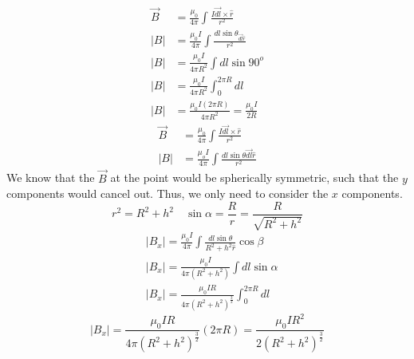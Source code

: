 \documentclass{article}
\begin{document}
$$
\begin{aligned}
\vec{B} & =\frac{\mu_0}{4 \pi} \int \frac{I \overrightarrow{d l} \times \hat{r}}{r^2} \\
|B| & =\frac{\mu_0 I}{4 \pi} \int \frac{d l \sin \theta_{\overrightarrow{d l} \hat{r}}}{r^2} \\
|B| & =\frac{\mu_0 I}{4 \pi R^2} \int d l \sin 90^o \\
|B| & =\frac{\mu_0 I}{4 \pi R^2} \int_0^{2\pi R} d l \\
|B| & =\frac{\mu_0 I(2 \pi R)}{4 \pi R^2}=\frac{\mu_0 I}{2 R}
\end{aligned}
$$
\sol
{}
$$
\begin{aligned}
\vec{B} & =\frac{\mu_0}{4 \pi} \int \frac{I \overrightarrow{d l} \times \hat{r}}{r^2} \\
|B| & =\frac{\mu_o I}{4 \pi} \int \frac{d l \sin \theta \overrightarrow{d l} \hat{r}}{r^2}
\end{aligned}
$$
We know that the $\vec{B}$ at the point would be spherically symmetric, such that the $y$ components would cancel out. Thus, we only need to consider the $x$ components.
$$ r^2=R^2+h^2 \quad \sin \alpha=\frac{R}{r}=\frac{R}{\sqrt{R^2+h^2}} $$
$$
\begin{aligned}
& \left|B_x\right|=\frac{\mu_0 I}{4 \pi} \int \frac{d l \sin \theta}{R^2+h^2 \hat{r}} \cos \beta \\
& \left|B_x\right|=\frac{\mu_0 I}{4 \pi\left(R^2+h^2\right)} \int d l \sin \alpha \\
& \left|B_x\right|=\frac{\mu_0 I R}{4 \pi\left(R^2+h^2\right)^{\frac{3}{2}}} \int_0^{2 \pi R} d l
\end{aligned}
$$
$$
\left|B_x\right|=\frac{\mu_0 I R}{4 \pi\left(R^2+h^2\right)^{\frac{3}{2}}}(2 \pi R)=\frac{\mu_0 I R^2}{2\left(R^2+h^2\right)^{\frac{3}{2}}}
$$
\end{document}
